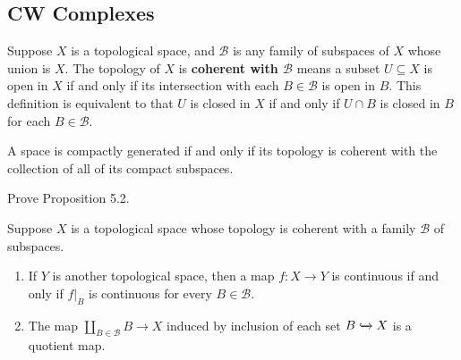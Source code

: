 \subsection{CW Complexes}

Suppose $X$ is a topological space, and $\mathscr{B}$ is any family of subspaces of $X$ whose union is $X$. The topology of $X$ is \textbf{coherent with $\mathscr{B}$} means a subset $U \subseteq X$ is open in $X$ if and only if its intersection with each $B\in\mathscr{B}$ is open in $B$. This definition is equivalent to that $U$ is closed in $X$ if and only if $U\cap B$ is closed in $B$ for each $B \in \mathscr{B}$.

A space is compactly generated if and only if its topology is coherent with the collection of all of its compact subspaces.

\begin{exercise}{5.3}\label{exercise:5.3}
	Prove Proposition 5.2.

	Suppose $X$ is a topological space whose topology is coherent with a family $\mathscr{B}$ of subspaces.
	\begin{enumerate}[label={(\alph*)}]
		\item If $Y$ is another topological space, then a map $f: X\to Y$ is continuous if and only if $f\vert_{B}$ is continuous for every $B\in \mathscr{B}$.
		\item The map $\coprod_{B\in\mathscr{B}}B \to X$ induced by inclusion of each set $B\xhookrightarrow{} X$ is a quotient map.
	\end{enumerate}
\end{exercise}

